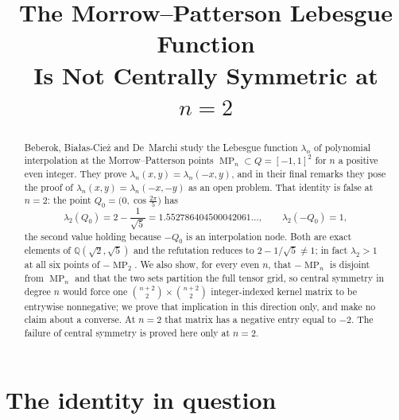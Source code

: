 \documentclass[11pt]{amsart}
\title[MP Lebesgue function: no central symmetry at $n=2$]
{The Morrow--Patterson Lebesgue Function\\Is Not Centrally Symmetric at $n=2$}
\date{}
\DeclareMathOperator{\MP}{MP}
\newcommand{\Q}{Q}
\begin{document}
\begin{abstract}
Beberok, Bia\l as-Cie\.z and De~Marchi study the Lebesgue function $\lambda_n$
of polynomial interpolation at the Morrow--Patterson points
$\MP_n\subset\Q=[-1,1]^2$ for $n$ a positive even integer. They prove
$\lambda_n(x,y)=\lambda_n(-x,y)$, and in their final remarks they pose the proof
of $\lambda_n(x,y)=\lambda_n(-x,-y)$ as an open problem. That identity is false
at $n=2$: the point $Q_0=\bigl(0,\cos\frac{2\pi}{5}\bigr)$ has
\[
  \lambda_2(Q_0)=2-\frac1{\sqrt5}=1.552786404500042061\ldots,
  \qquad
  \lambda_2(-Q_0)=1,
\]
the second value holding because $-Q_0$ is an interpolation node. Both are exact
elements of $\mathbb Q(\sqrt2,\sqrt5)$ and the refutation reduces to
$2-1/\sqrt5\ne1$; in fact $\lambda_2>1$ at all six points of $-\MP_2$. We also
show, for every even $n$, that $-\MP_n$ is disjoint from $\MP_n$ and that the two
sets partition the full tensor grid, so central symmetry in degree $n$ would
force one $\binom{n+2}{2}\times\binom{n+2}{2}$ integer-indexed kernel matrix to
be entrywise nonnegative; we prove that implication in this direction only, and
make no claim about a converse. At $n=2$ that matrix has a negative entry equal
to $-2$. The failure of central symmetry is proved here only at $n=2$.
\end{abstract}

\maketitle

\section{The identity in question}
\end{document}
